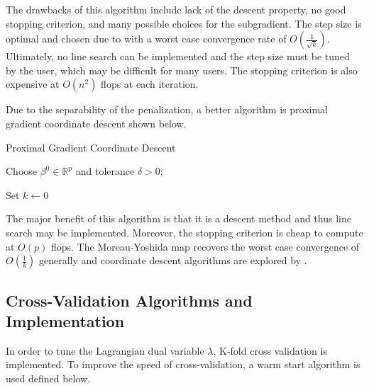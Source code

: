 \documentclass[article]{jss}
\numberwithin{equation}{section}
\newcommand{\R}{\mathbb{R}}
\begin{document}
The drawbacks of this algorithm include lack of the descent property, no good stopping criterion, and many possible choices for the subgradient.
The step size is optimal and chosen due to \cite{nesterov} with a worst case convergence rate of $O(\frac{1}{\sqrt{k}})$.
Ultimately, no line search can be implemented and the step size must be tuned by the user, which may be difficult for many users.
The stopping criterion is also expensive at $O(n^2)$ flops at each iteration.

Due to the separability of the penalization, a better algorithm is proximal gradient coordinate descent shown below.

\vspace{.2cm}
\begin{algorithm}[H]
\caption{Proximal Gradient Coordinate Descent}
Choose $\beta^0 \in \R^p$ and tolerance $\delta > 0$;

Set $k \gets 0$

\end{algorithm}
\vspace{.2cm}

The major benefit of this algorithm is that it is a descent method and thus line search may be implemented.
Moreover, the stopping criterion is cheap to compute at $O(p)$ flops.
The Moreau-Yoshida map recovers the worst case convergence of $O(\frac{1}{k})$ generally and coordinate descent algorithms are explored by \cite{nesterov2}.

\subsection{Cross-Validation Algorithms and Implementation}

In order to tune the Lagrangian dual variable $\lambda$, K-fold cross validation is implemented.
To improve the speed of cross-validation, a warm start algorithm is used defined below.
\end{document}
